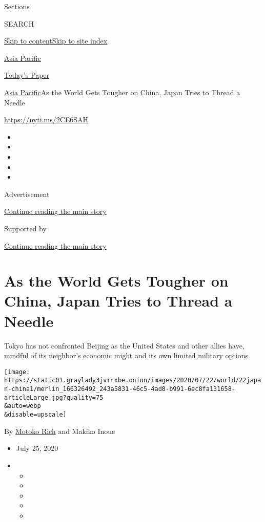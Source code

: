 Sections

SEARCH

\protect\hyperlink{site-content}{Skip to
content}\protect\hyperlink{site-index}{Skip to site index}

\href{https://www.nytimes3xbfgragh.onion/section/world/asia}{Asia
Pacific}

\href{https://myaccount.nytimes3xbfgragh.onion/auth/login?response_type=cookie\&client_id=vi}{}

\href{https://www.nytimes3xbfgragh.onion/section/todayspaper}{Today's
Paper}

\href{/section/world/asia}{Asia Pacific}\textbar{}As the World Gets
Tougher on China, Japan Tries to Thread a Needle

\url{https://nyti.ms/2CE6SAH}

\begin{itemize}
\item
\item
\item
\item
\item
\end{itemize}

Advertisement

\protect\hyperlink{after-top}{Continue reading the main story}

Supported by

\protect\hyperlink{after-sponsor}{Continue reading the main story}

\hypertarget{as-the-world-gets-tougher-on-china-japan-tries-to-thread-a-needle}{%
\section{As the World Gets Tougher on China, Japan Tries to Thread a
Needle}\label{as-the-world-gets-tougher-on-china-japan-tries-to-thread-a-needle}}

Tokyo has not confronted Beijing as the United States and other allies
have, mindful of its neighbor's economic might and its own limited
military options.

\texttt{[image: https://static01.graylady3jvrrxbe.onion/images/2020/07/22/world/22japan-china1/merlin\_166326492\_243a5831-46c5-4ad8-b991-6ec8fa131658-articleLarge.jpg?quality=75\\\&auto=webp\\\&disable=upscale]}

By \href{https://www.nytimes3xbfgragh.onion/by/motoko-rich}{Motoko Rich}
and Makiko Inoue

\begin{itemize}
\item
  July 25, 2020
\item
  \begin{itemize}
  \item
  \item
  \item
  \item
  \item
  \end{itemize}
\end{itemize}

